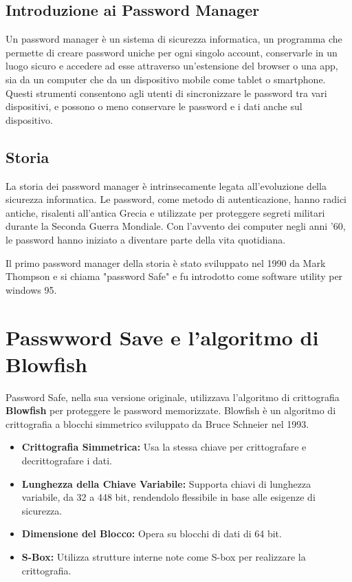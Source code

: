 \documentclass[a4paper,12pt]{report}
\begin{document}
	\subsection*{Introduzione ai Password Manager} 
	Un password manager è un sistema di
	sicurezza informatica, un programma che permette di creare password uniche per
	ogni singolo account, conservarle in un luogo sicuro e accedere ad esse
	attraverso un’estensione del browser o una app, sia da un computer che da un
	dispositivo mobile come tablet o smartphone. Questi strumenti consentono agli
	utenti di sincronizzare le password tra vari dispositivi, e possono o meno
	conservare le password e i dati anche sul dispositivo. 
	\subsection*{Storia } 
	La storia dei password manager è intrinsecamente legata all'evoluzione della
	sicurezza informatica. Le password, come metodo di autenticazione, hanno radici
	antiche, risalenti all'antica Grecia e utilizzate per proteggere segreti
	militari durante la Seconda Guerra Mondiale. Con l'avvento dei computer negli
	anni '60, le password hanno iniziato a diventare parte della vita quotidiana.

	Il primo password manager della storia è stato sviluppato nel 1990 da Mark
	Thompson \cite{password-manager-hystory} e si chiama "password Safe" e 
	fu introdotto come software utility per windows 95. 

	\section{Passwword Save e l'algoritmo di Blowfish}
	Password Safe, nella sua versione originale, utilizzava l'algoritmo di
	crittografia \textbf{Blowfish} per proteggere le password memorizzate.
	Blowfish è un algoritmo di crittografia a blocchi simmetrico sviluppato da
	Bruce Schneier nel 1993.

	\begin{itemize}
		\item \textbf{Crittografia Simmetrica:} Usa la stessa chiave per
		crittografare e decrittografare i dati.
		\item \textbf{Lunghezza della Chiave Variabile:} Supporta chiavi di
		lunghezza variabile, da 32 a 448 bit, rendendolo flessibile in base alle
		esigenze di sicurezza.
		\item \textbf{Dimensione del Blocco:} Opera su blocchi di dati di 64
		bit.
		\item \textbf{S-Box:} Utilizza strutture interne note come
		S-box per realizzare la crittografia.
	\end{itemize}
\end{document}
